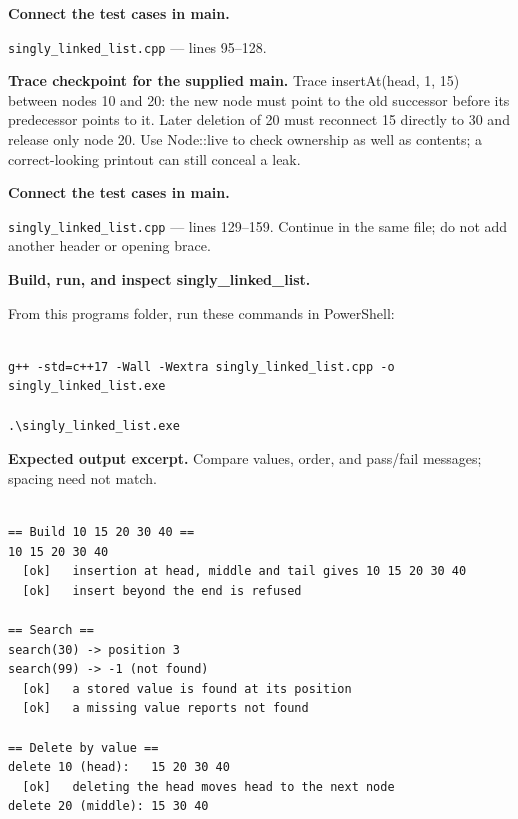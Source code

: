 


\tcbbreak

\begin{utpsteps}\setcounter{enumi}{3}\item \textbf{Connect the test cases in main.}\end{utpsteps}

\texttt{singly\_linked\_list.cpp} --- lines 95--128.

\textbf{Trace checkpoint for the supplied main.} Trace insertAt(head, 1, 15) between nodes 10 and 20: the new node must point to the old successor before its predecessor points to it. Later deletion of 20 must reconnect 15 directly to 30 and release only node 20. Use Node::live to check ownership as well as contents; a correct-looking printout can still conceal a leak.




\tcbbreak

\begin{utpsteps}\setcounter{enumi}{4}\item \textbf{Connect the test cases in main.}\end{utpsteps}

\texttt{singly\_linked\_list.cpp} --- lines 129--159. Continue in the same file; do not add another header or opening brace.






\tcbbreak

\textbf{Build, run, and inspect singly\_linked\_list.}

From this program\textquotesingle s folder, run these commands in PowerShell:

\begin{lstlisting}[style=utpterminal,language={}]

g++ -std=c++17 -Wall -Wextra singly_linked_list.cpp -o singly_linked_list.exe

.\singly_linked_list.exe

\end{lstlisting}

\textbf{Expected output excerpt.} Compare values, order, and pass/fail messages; spacing need not match.

\begin{lstlisting}[style=utpterminal,language={}]

== Build 10 15 20 30 40 ==
10 15 20 30 40 
  [ok]   insertion at head, middle and tail gives 10 15 20 30 40
  [ok]   insert beyond the end is refused

== Search ==
search(30) -> position 3
search(99) -> -1 (not found)
  [ok]   a stored value is found at its position
  [ok]   a missing value reports not found

== Delete by value ==
delete 10 (head):   15 20 30 40 
  [ok]   deleting the head moves head to the next node
delete 20 (middle): 15 30 40

\end{lstlisting}

